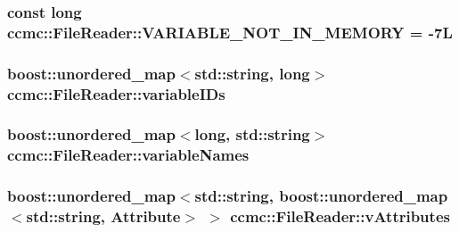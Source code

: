 \hypertarget{classccmc_1_1_file_reader_a0fc7cfefa991aca0f26f2f533d4031ff}{
\subsubsection[{V\-A\-R\-I\-A\-B\-L\-E\-\_\-\-N\-O\-T\-\_\-\-I\-N\-\_\-\-M\-E\-M\-O\-R\-Y}]{\setlength{\rightskip}{0pt plus 5cm}const long ccmc\-::\-File\-Reader\-::\-V\-A\-R\-I\-A\-B\-L\-E\-\_\-\-N\-O\-T\-\_\-\-I\-N\-\_\-\-M\-E\-M\-O\-R\-Y = -\/7\-L\hspace{0.3cm}{\ttfamily [static]}}}\label{classccmc_1_1_file_reader_a0fc7cfefa991aca0f26f2f533d4031ff}
\hypertarget{classccmc_1_1_file_reader_af87bd665411c9c8ce943040ff5b13055}{
\subsubsection[{variable\-I\-Ds}]{\setlength{\rightskip}{0pt plus 5cm}boost\-::unordered\-\_\-map$<$std\-::string, long$>$ ccmc\-::\-File\-Reader\-::variable\-I\-Ds\hspace{0.3cm}{\ttfamily [protected]}}}\label{classccmc_1_1_file_reader_af87bd665411c9c8ce943040ff5b13055}
\hypertarget{classccmc_1_1_file_reader_a94d580d26fd966be477efb3fd9877ea9}{
\subsubsection[{variable\-Names}]{\setlength{\rightskip}{0pt plus 5cm}boost\-::unordered\-\_\-map$<$long, std\-::string$>$ ccmc\-::\-File\-Reader\-::variable\-Names\hspace{0.3cm}{\ttfamily [protected]}}}\label{classccmc_1_1_file_reader_a94d580d26fd966be477efb3fd9877ea9}
\hypertarget{classccmc_1_1_file_reader_a1eb038b0d8cb945df2b02c4cb63d0aa3}{
\subsubsection[{v\-Attributes}]{\setlength{\rightskip}{0pt plus 5cm}boost\-::unordered\-\_\-map$<$std\-::string, boost\-::unordered\-\_\-map$<$std\-::string, {\bf Attribute}$>$ $>$ ccmc\-::\-File\-Reader\-::v\-Attributes\hspace{0.3cm}{\ttfamily [protected]}}}\label{classccmc_1_1_file_reader_a1eb038b0d8cb945df2b02c4cb63d0aa3}


